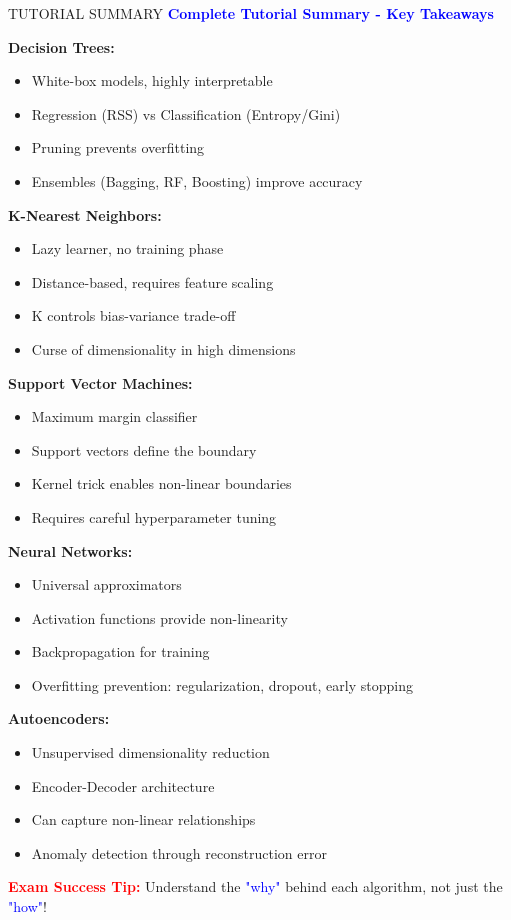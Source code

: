 \documentclass[8pt]{beamer}
\begin{document}
	\begin{frame}{TUTORIAL SUMMARY}
		\fontsize{6.5}{7.5}\selectfont
		\textcolor{blue}{\textbf{Complete Tutorial Summary - Key Takeaways}}
		
		\textbf{Decision Trees:}
		\begin{itemize}
			\item White-box models, highly interpretable
			\item Regression (RSS) vs Classification (Entropy/Gini)
			\item Pruning prevents overfitting
			\item Ensembles (Bagging, RF, Boosting) improve accuracy
		\end{itemize}
		
		\textbf{K-Nearest Neighbors:}
		\begin{itemize}
			\item Lazy learner, no training phase
			\item Distance-based, requires feature scaling
			\item K controls bias-variance trade-off
			\item Curse of dimensionality in high dimensions
		\end{itemize}
		
		\textbf{Support Vector Machines:}
		\begin{itemize}
			\item Maximum margin classifier
			\item Support vectors define the boundary
			\item Kernel trick enables non-linear boundaries
			\item Requires careful hyperparameter tuning
		\end{itemize}
		
		\textbf{Neural Networks:}
		\begin{itemize}
			\item Universal approximators
			\item Activation functions provide non-linearity
			\item Backpropagation for training
			\item Overfitting prevention: regularization, dropout, early stopping
		\end{itemize}
		
		\textbf{Autoencoders:}
		\begin{itemize}
			\item Unsupervised dimensionality reduction
			\item Encoder-Decoder architecture
			\item Can capture non-linear relationships
			\item Anomaly detection through reconstruction error
		\end{itemize}
		
		\textcolor{red}{\textbf{Exam Success Tip:}} Understand the \textcolor{blue}{"why"} behind each algorithm, not just the \textcolor{blue}{"how"}!
	\end{frame}
	
\end{document}
